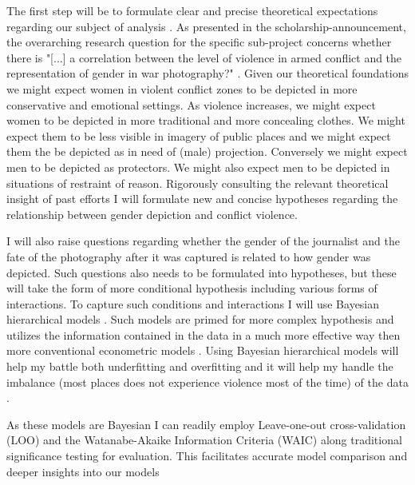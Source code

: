 \documentclass[a4paper]{article}
\begin{document}
The first step will be to formulate clear and precise theoretical expectations regarding our subject of analysis \cite[30-53]{Cederman_Gleditsch_Buhaug_2013}. As presented in the scholarship-announcement, the overarching research question for the specific sub-project concerns whether there is "[...] a correlation between the level of violence in armed conflict and the representation of gender in war photography?" \citep{bodies}. Given our theoretical foundations we might expect women in violent conflict zones to be depicted in more conservative and emotional settings. As violence increases, we might expect women to be depicted in more traditional and more concealing clothes. We might expect them to be less visible in imagery of public places and we might expect them the be depicted as in need of (male) projection. Conversely we might expect men to be depicted as protectors. We might also expect men to be depicted in situations of restraint of reason. 
Rigorously consulting the relevant theoretical insight of past efforts I will formulate new and concise hypotheses regarding the relationship between gender depiction and conflict violence.\par 

I will also raise questions regarding whether the gender of the journalist and the fate of the photography after it was captured is related to how gender was depicted. Such questions also needs to be formulated into hypotheses, but these will take the form of more conditional hypothesis including various forms of interactions. To capture such conditions and interactions I will use Bayesian hierarchical models \citep{Gelman_2006, Gelman_2013, Mcelreath_2018}. Such models are primed for more complex hypothesis and utilizes the information contained in the data in a much more effective way then more conventional econometric models \cite[355]{Mcelreath_2018}. Using Bayesian hierarchical models will help my battle both underfitting and overfitting and it will help my handle the imbalance (most places does not experience violence most of the time) of the data \cite[356-357]{Mcelreath_2018}. \par

As these models are Bayesian I can readily employ Leave-one-out cross-validation (LOO) and the Watanabe-Akaike Information Criteria (WAIC) along traditional significance testing for evaluation. This facilitates accurate model comparison and deeper insights into our models \cite[165-205]{Mcelreath_2018} \par
\end{document}
